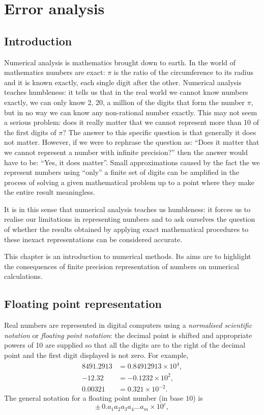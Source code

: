 \chapter{Error analysis}

\section{Introduction}

Numerical analysis is mathematics brought down to earth.  In the world
of mathematics   numbers   are exact:   $\pi$ is  the   ratio  of  the
circumference to its radius and it is known exactly, each single digit
after  the other.  Numerical analysis teaches  humbleness: it tells us
that in  the real world  we cannot know numbers  exactly, we  can only
know 2, 20, a million of the digits that form the number $\pi$, but in
no way we can know any non-rational number exactly.  This may not seem
a serious problem: does it really matter that we cannot represent more
than 10 of the  first digits of  $\pi$?   The answer to  this specific
question is that generally it does not matter.  However, if we were to
rephrase the question as: ``Does it  matter that we cannot represent a
number with infinite  precision?'' then the answer  would have to  be:
``Yes, it does matter''.  Small approximations caused  by the fact the
we  represent numbers  using  ``only'' a finite set  of  digits can be
amplified in the process of solving a given mathematical problem up to
a point where they make the entire result meaningless.

It is in this sense that numerical analysis  teaches us humbleness: it
forces us to  realise our limitations  in representing  numbers and to
ask ourselves the question of whether the results obtained by applying
exact mathematical procedures to  these inexact representations can be
considered accurate.

This chapter is an introduction to numerical methods.   Its aims are
to highlight the consequences of finite precision representation of
numbers on numerical calculations.

\section{Floating point representation}

Real    numbers are represented     in   digital  computers   using  a
\textit{normalised scientific   notation} or   \textit{floating  point
notation}: the  decimal point is shifted  and appropriate powers of 10
are  supplied so that  all the digits are to  the right of the decimal
point and the first digit displayed is not zero.  For example,
%
\begin{align*}
  8491.2913 & = 0.84912913 \times 10^4 , \\
  -12.32 & = -0.1232 \times 10^2 , \\
  0.00321 & = 0.321 \times 10^{-2} .
\end{align*}
%
The general notation for a floating point number (in base $10$) is 
%
\begin{equation*}
 \pm \, 0.a_1 a_2 a_3 a_4 \ldots a_m \times 10^c ,
\end{equation*}

